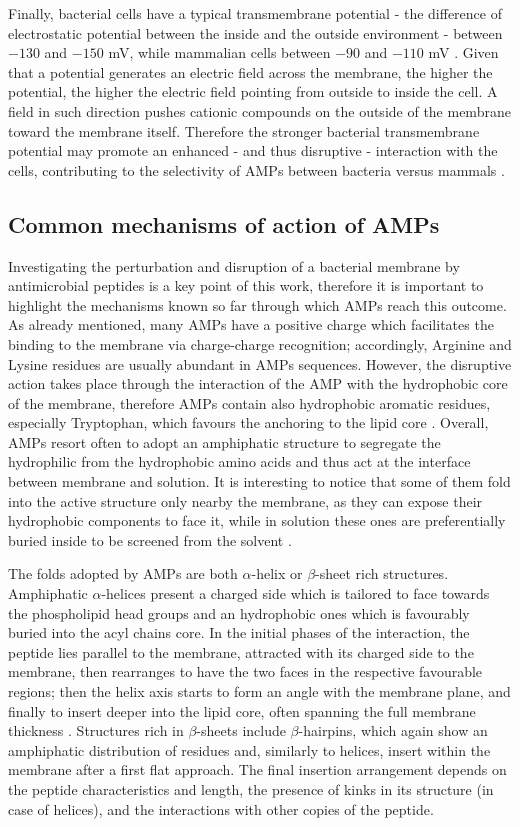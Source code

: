 Finally, bacterial cells have a typical transmembrane potential - the difference of electrostatic potential between the inside and the outside environment - between $-130$ and $-150$ mV, while mammalian cells between $-90$ and $-110$ mV \cite{Yeaman2003,Matsuzaki2009,Ebenhan2014}.
%
Given that a potential generates an electric field across the membrane, the higher the potential, the higher the electric field pointing from outside to inside the cell. A field in such direction pushes cationic compounds on the outside of the membrane toward the membrane itself. Therefore the stronger bacterial transmembrane potential may promote an enhanced - and thus disruptive - interaction with the cells, contributing to the selectivity of AMPs between bacteria versus mammals \cite{Yeaman2003}.

\subsection{Common mechanisms of action of AMPs} \label{AMP_mechs}
Investigating the perturbation and disruption of a bacterial membrane by antimicrobial peptides is a key point of this work, therefore it is important to highlight the mechanisms known so far through which AMPs reach this outcome.
%
As already mentioned, many AMPs have a positive charge which facilitates the binding to the membrane via charge-charge recognition; accordingly, Arginine and Lysine residues are usually abundant in AMPs sequences. However, the disruptive action takes place through the interaction of the AMP with the hydrophobic core of the membrane, therefore AMPs contain also hydrophobic aromatic residues, especially Tryptophan, which favours the anchoring to the lipid core \cite{Chan2006}.
%
Overall, AMPs resort often to adopt an amphiphatic structure to segregate the hydrophilic from the hydrophobic amino acids and thus act at the interface between membrane and solution. It is interesting to notice that some of them fold into the active structure only nearby the membrane, as they can expose their hydrophobic components to face it, while in solution these ones are preferentially buried inside to be screened from the solvent \cite{Nguyen2011}.

The folds adopted by AMPs are both $\alpha$-helix or $\beta$-sheet rich structures. Amphiphatic $\alpha$-helices present a charged side which is tailored to face towards the phospholipid head groups and an hydrophobic ones which is favourably buried into the acyl chains core. In the initial phases of the interaction, the peptide lies parallel to the membrane, attracted with its charged side to the membrane, then rearranges to have the two faces in the respective favourable regions; then the helix axis starts to form an angle with the membrane plane, and finally to insert deeper into the lipid core, often spanning the full membrane thickness \cite{Ebenhan2014}.
%
Structures rich in $\beta$-sheets include $\beta$-hairpins, which again show an amphiphatic distribution of residues and, similarly to helices, insert within the membrane after a first flat approach.
%
The final insertion arrangement depends on the peptide characteristics and length, the presence of kinks in its structure (in case of helices), and the interactions with other copies of the peptide.

